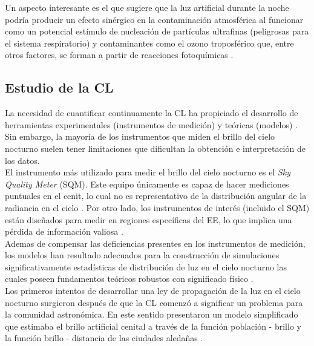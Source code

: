 Un aspecto interesante es el que sugiere que la luz artificial durante la noche podría producir un efecto sinérgico en la contaminación atmosférica al funcionar como un potencial estímulo de nucleación de partículas ultrafinas (peligrosas para el sistema respiratorio) y contaminantes como el ozono troposférico que, entre otros factores, se forman a partir de reacciones fotoquímicas \citep{LibroCL}.\\ 

\newpage 
 
\subsection{Estudio de la CL}

La necesidad de cuantificar continuamente la CL ha propiciado el desarrollo de herramientas experimentales (instrumentos de medición) y teóricas (modelos) \citep{Kocifaj2015}. Sin embargo, la mayoría de los instrumentos que miden el brillo del cielo nocturno suelen tener limitaciones que dificultan la obtención e interpretación de los datos.\\

El instrumento más utilizado para medir el brillo del cielo nocturno es el \textit{Sky Quality Meter} (SQM). Este equipo únicamente es capaz de hacer mediciones puntuales en el cenit, lo cual no es representativo de la distribución angular de la radiancia en el cielo \citep{Ribas2015}. Por otro lado, los instrumentos de interés (incluido el SQM) están diseñados para medir en regiones específicas del EE, lo que implica una pérdida de información valiosa \citep{Ribas2015}.\\

Ademas de compensar las deficiencias presentes en los instrumentos de medición, los modelos han resultado adecuados para la construcción de simulaciones significativamente estadísticas de distribución de luz en el cielo nocturno las cuales poseen fundamentos teóricos robustos con significado físico \citep{Solano2015}.\\

Los primeros intentos de desarrollar una ley de propagación de la luz en el cielo nocturno surgieron después de que la CL comenzó a significar un problema para la comunidad astronómica. En este sentido \cite{Bertiau1973} presentaron un modelo simplificado que estimaba el brillo artificial cenital a través de la función población - brillo y la función brillo - distancia de las ciudades aledañas \citep{Linares2018}.\\

